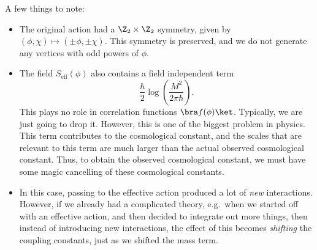 \documentclass[a4paper]{article}
\begin{document}
A few things to note:
\begin{itemize}
  \item The original action had a $\Z_2 \times \Z_2$ symmetry, given by $(\phi, \chi) \mapsto (\pm \phi, \pm \chi)$. This symmetry is preserved, and we do not generate any vertices with odd powers of $\phi$.
  \item The field $S_{\mathrm{eff}}(\phi)$ also contains a field independent term
    \[
      \frac{\hbar}{2} \log \left(\frac{M^2}{2\pi \hbar}\right).
    \]
    This plays no role in correlation functions $\bra f(\phi)\ket$. Typically, we are just going to drop it. However, this is one of the biggest problem in physics. This term contributes to the cosmological constant, and the scales that are relevant to this term are much larger than the actual observed cosmological constant. Thus, to obtain the observed cosmological constant, we must have some magic cancelling of these cosmological constants.
  \item In this case, passing to the effective action produced a lot of \emph{new} interactions. However, if we already had a complicated theory, e.g.\ when we started off with an effective action, and then decided to integrate out more things, then instead of introducing new interactions, the effect of this becomes \emph{shifting} the coupling constants, just as we shifted the mass term.
\end{itemize}
\end{document}
